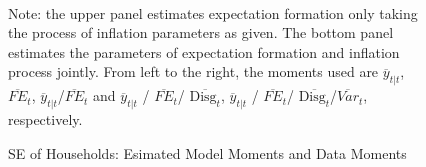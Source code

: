 \documentclass[]{article}
\begin{document}
\begin{figure}[ht]
\begin{subfigure}[b]{\textwidth}
	\end{subfigure}
	\\
	\begin{flushleft}
		{\footnotesize Note: the upper panel estimates expectation formation only taking the process of inflation parameters as given. The bottom panel estimates the parameters of expectation formation and inflation process jointly. From left to the right, the moments used are $\overline y_{t|t}$, $\overline{FE}_{t}$, $\overline y_{t|t}$/$\overline{FE}_{t}$ and $\overline y_{t|t}$ / $\overline{FE}_{t}$/ $\overline{\textrm{Disg}_t}$, $\overline y_{t|t}$ / $\overline{FE}_{t}$/ $\overline{\textrm{Disg}_t}$/$\overline{Var}_t$,  respectively. }
	\end{flushleft}
	\caption{SE of Households: Esimated Model Moments and Data Moments}
\end{figure}
\end{document}
